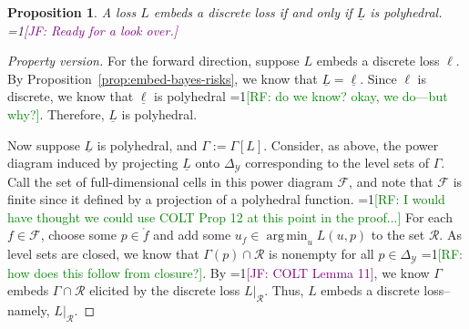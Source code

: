\documentclass[12pt]{article}
\newcommand{\Comments}{1}
\newcommand{\mynote}[2]{\ifnum\Comments=1\textcolor{#1}{#2}\fi}
\newcommand{\raf}[1]{\mynote{green}{[RF: #1]}}
\newcommand{\jessie}[1]{\mynote{purple}{[JF: #1]}}
\newcommand{\prop}[1]{\Gamma[#1]}
\newcommand{\simplex}{\Delta_\Y}
\newcommand{\F}{\mathcal{F}}
\newcommand{\R}{\mathcal{R}}
\newcommand{\Y}{\mathcal{Y}}
\newcommand{\risk}[1]{\underline{#1}}
\newcommand{\inter}[1]{\mathring{#1}}%
\DeclareMathOperator*{\argmin}{arg\,min}
\newtheorem{proposition}{Proposition}
\begin{document}
\begin{proposition}\label{prop:embed-risk-poly}
  A loss $L$ embeds a discrete loss if and only if $\risk{L}$ is polyhedral.
  \jessie{Ready for a look over.}
\end{proposition}
\begin{proof}[Property version]
  For the forward direction, suppose $L$ embeds a discrete loss $\ell$.
  By Proposition~\ref{prop:embed-bayes-risks}, we know that $\risk{L} = \risk{\ell}$.
  Since $\ell$ is discrete, we know that $\risk{\ell}$ is polyhedral \raf{do we know? okay, we do---but why?}.
  Therefore, $\risk{L}$ is polyhedral.
  
  Now suppose $\risk{L}$ is polyhedral, and $\Gamma := \prop{L}$.
  Consider, as above, the power diagram induced by projecting $\risk{L}$ onto $\simplex$ corresponding to the level sets of $\Gamma$.
  Call the set of full-dimensional cells in this power diagram $\F$, and note that $\F$ is finite since it defined by a projection of a polyhedral function.
  \raf{I would have thought we could use COLT Prop 12 at this point in the proof...}
  For each $f \in \F$, choose some $p \in \inter{f}$ and add some $u_f \in \argmin_u L(u, p)$ to the set $\R$.
  As level sets are closed, we know that $\Gamma(p) \cap \R$ is nonempty for all $p \in \simplex$ \raf{how does this follow from closure?}.
  By \jessie{COLT Lemma 11}, we know $\Gamma$ embeds $\Gamma \cap \R$ elicited by the discrete loss $L|_\R$. 
  Thus, $L$ embeds a discrete loss-- namely, $L|_\R$.
\end{proof}
%
%
\end{document}

